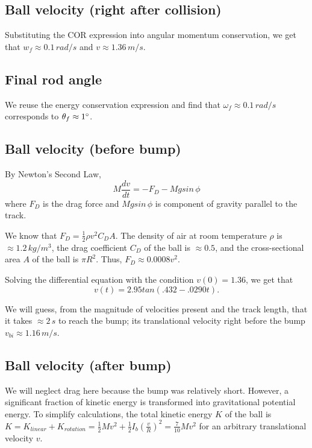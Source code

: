 \documentclass[12pt]{article} %
\begin{document}
\subsection{Ball velocity (right after collision)}

Substituting the COR expression into angular momentum conservation, we get that $w_f \approx 0.1\,rad/s$ and $v \approx 1.36\,m/s$.

\subsection{Final rod angle}

We reuse the energy conservation expression and find that $\omega_f \approx 0.1\,rad/s$ corresponds to $\theta_f \approx 1\degree$.

\subsection{Ball velocity (before bump)}

By Newton's Second Law,
$$M \frac{dv}{dt} = -F_D - Mgsin\,\phi$$
where $F_D$ is the drag force and $Mgsin\,\phi$ is component of gravity parallel to the track.

We know that $F_D = \frac{1}{2}\rho v^2 C_D A$. The density of air at room temperature $\rho$ is $\approx 1.2\,kg/m^3$, the drag coefficient $C_D$ of the ball is $\approx 0.5$, and the cross-sectional area $A$ of the ball is $\pi R^2$.
Thus, $F_D \approx 0.0008v^2$.

Solving the differential equation with the condition $v(0) = 1.36$, we get that $$v(t) = 2.95tan(.432 - .0290t).$$

We will guess, from the magnitude of velocities present and the track length, that it takes $\approx 2\,s$ to reach the bump; its translational velocity right before the bump $v_{bi} \approx 1.16\,m/s$.

\subsection{Ball velocity (after bump)}

We will neglect drag here because the bump was relatively short.
However, a significant fraction of kinetic energy is transformed into gravitational potential energy.
To simplify calculations, the total kinetic energy $K$ of the ball is $K = K_{linear} + K_{rotation} = \frac{1}{2}Mv^2 + \frac{1}{2}I_b(\frac{v}{R})^2 = \frac{7}{10}Mv^2$ for an arbitrary translational velocity $v$.
\end{document}
